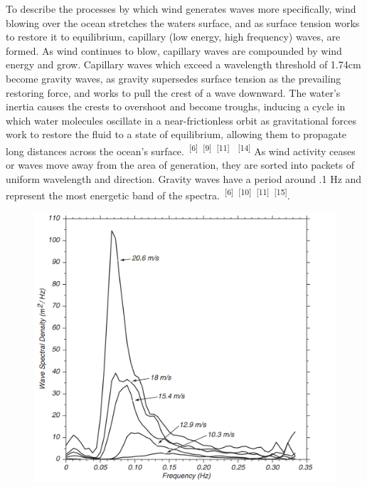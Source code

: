 \documentclass{article}
\begin{document}

\par{To describe the processes by which wind generates waves more specifically, wind blowing over the ocean stretches the waters surface, and as surface tension works to restore it to equilibrium, capillary (low energy, high frequency) waves, are formed. As wind continues to blow, capillary waves are compounded by wind energy and grow. Capillary waves which exceed a wavelength threshold of 1.74cm become gravity waves, as gravity supersedes surface tension as the prevailing restoring force, and works to pull the crest of a wave downward. The water's inertia causes the crests to overshoot and become troughs, inducing a cycle in which water molecules oscillate in a near-frictionless orbit as gravitational forces work to restore the fluid to a state of equilibrium, allowing them to propagate long distances across the ocean's surface.~\textsuperscript{[6]}~\textsuperscript{[9]}~\textsuperscript{[11]} ~\textsuperscript{[14]} As wind activity ceases or waves move away from the area of generation, they are sorted into packets of uniform wavelength and direction. Gravity waves have a period around .1 Hz and represent the most energetic band of the spectra.~\textsuperscript{[6]}~\textsuperscript{[10]}~\textsuperscript{[11]}~\textsuperscript{[15]}.}



\begin{figure}
    \centering
    \includegraphics[width=0.75\linewidth]{images/developed-sea-power-spectrum.png}
    \label{figure3}
\end{figure}
\end{document}
